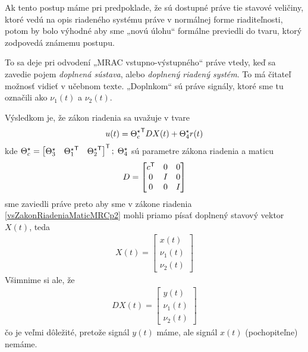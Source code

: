 \documentclass[a4paper, 10pt, ]{article}
\begin{document}
Ak tento postup máme pri predpoklade, že sú dostupné práve tie stavové veličiny, ktoré vedú na opis riadeného systému práve v normálnej forme riaditeľnosti, potom by bolo výhodné aby sme „novú úlohu“ formálne previedli do tvaru, ktorý zodpovedá známemu postupu.

To sa deje pri odvodení „MRAC vstupno-výstupného“ práve vtedy, keď sa zavedie pojem \emph{doplnená sústava}, alebo \emph{doplnený riadený systém}. To má čitateľ možnosť vidieť v učebnom texte. „Doplnkom“ sú práve signály, ktoré sme tu označili ako $\nu_1(t)$ a $\nu_2(t)$.

Výsledkom je, že zákon riadenia sa uvažuje v tvare
\begin{equation} \label{vsZakonRiadeniaMaticMRCp2}
	u(t) = {\Theta_c^\star}^{\mathsf{T}} D X(t) + \Theta_4^\star r(t)
\end{equation}
kde $ \Theta_c^\star = \begin{bmatrix} \Theta_3^\star & {\Theta_1^\star}^{\mathsf{T}} & {\Theta_2^\star}^{\mathsf{T}} \end{bmatrix}^{\mathsf{T}}; \; \Theta_4^\star $ sú parametre zákona riadenia a maticu
\begin{align*}
	D = \begin{bmatrix} c^{\mathsf{T}} & 0 & 0 \\ 0 & I & 0 \\ 0 & 0 & I \end{bmatrix}
\end{align*}
sme zaviedli práve preto aby sme v zákone riadenia \eqref{vsZakonRiadeniaMaticMRCp2} mohli priamo písať doplnený stavový vektor $X(t)$, teda
\begin{align}
    X(t) = \begin{bmatrix} x(t) \\ \nu_1(t) \\ \nu_2(t) \end{bmatrix}
\end{align}
Všimnime si ale, že
\begin{align}
    DX(t) = \begin{bmatrix} y(t) \\ \nu_1(t) \\ \nu_2(t) \end{bmatrix}
\end{align}
čo je veľmi dôležité, pretože signál $y(t)$ máme, ale signál $x(t)$ (pochopiteľne) nemáme.
\end{document}
